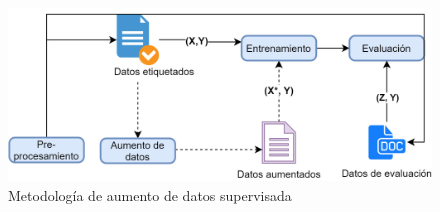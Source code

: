 \begin{figure}[h]
    \includegraphics[width=\textwidth]{sections/figures/methodposter.png}
    \caption{Metodología de aumento de datos supervisada}
    \label{fig:metodologia}
\end{figure}